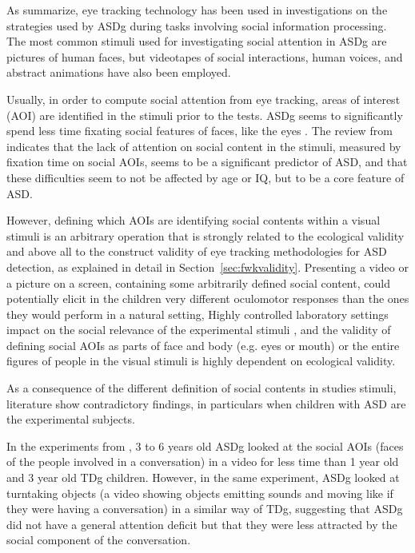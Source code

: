As \cite{pensiero2009saccades} summarize, eye tracking technology has been used in investigations on the strategies used by ASDg during tasks involving social information processing. The most common stimuli used for investigating social attention in ASDg are pictures of human faces, but videotapes of social interactions, human voices, and abstract animations have also been employed.

Usually, in order to compute social attention from eye tracking, areas of interest (AOI) are identified in the stimuli prior to the tests. ASDg seems to significantly spend less time fixating social features of faces, like the eyes \citep{papagiannopoulou2014review, boraston2007eyetrackingASD}. The review from \cite{chitategmark2016socialattention} indicates that the lack of attention on social content in the stimuli, measured by fixation time on social AOIs, seems to be a significant predictor of ASD, and that these difficulties seem to not be affected by age or IQ, but to be a core feature of ASD.

However, defining which AOIs are identifying social contents within a visual stimuli is an arbitrary operation that is strongly related to the ecological validity and above all to the construct validity of eye tracking methodologies for ASD detection, as explained in detail in Section~\ref{sec:fwkvalidity}. Presenting a video or a picture on a screen, containing some arbitrarily defined social content, could potentially elicit in the children very different oculomotor responses than the ones they would perform in a natural setting, Highly controlled laboratory settings impact on the social relevance of the experimental stimuli \citep{papagiannopoulou2014review}, and the validity of defining social AOIs as parts of face and body (e.g. eyes or mouth) or the entire figures of people in the visual stimuli is highly dependent on ecological validity.

As a consequence of the different definition of social contents in studies stimuli, literature show contradictory findings, in particulars when children with ASD are the experimental subjects.

In the experiments from \cite{vonhofsten2009lookingevents}, 3 to 6 years old ASDg looked at the social AOIs (faces of the people involved in a conversation) in a video for less time than 1 year old and 3 year old TDg children. However, in the same experiment, ASDg looked at turntaking objects (a video showing objects emitting sounds and moving like if they were having a conversation) in a similar way of TDg, suggesting that ASDg did not have a general attention deficit but that they were less attracted by the social component of the conversation. 


